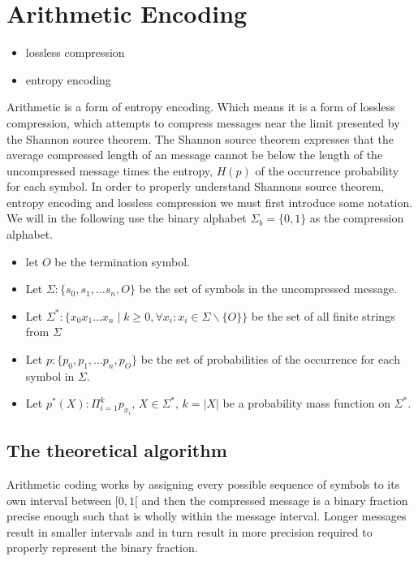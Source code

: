 \chapter{Arithmetic Encoding}
\begin{itemize}
    \item lossless compression
    \item entropy encoding
\end{itemize}

Arithmetic is a form of entropy encoding. Which means it is a form of lossless compression, which attempts to compress messages near the limit presented by the Shannon source theorem. The Shannon source theorem expresses that the average compressed length of an message cannot be below the length of the uncompressed message times the entropy, $H(p)$ of the occurrence probability for each symbol. In order to properly understand Shannons source theorem, entropy encoding and lossless compression we must first introduce some notation. We will in the following use the binary alphabet $\Sigma_b = \{0,1\}$ as the compression alphabet.\\

\begin{itemize}
    \item let $O$ be the termination symbol.
    \item Let $\Sigma : \{s_0,s_1, \dots s_n,O\}$ be the set of symbols in the uncompressed message. 
    \item Let $\Sigma^* : \{x_0x_1 \dots x_n \mid  k\geq0   ,\forall x_i : x_i \in \Sigma \backslash \{O\} \}$ be the set of all finite strings from $\Sigma$
    \item Let $p : \{p_0,p_1, \dots p_n,p_O\}$ be the set of probabilities of the occurrence for each symbol in $\Sigma$.
    \item Let $p^*(X) : \Pi_{i=1}^k p_{x_i},\, X \in \Sigma^*,\, k = |X|$ be a probability mass function on $\Sigma^*$.
\end{itemize}




\section{The theoretical algorithm}

Arithmetic coding works by assigning every possible sequence of symbols to its own interval between $[0,1[$ and then the compressed message is a binary fraction precise enough such that is wholly within the message interval. Longer messages result in smaller intervals and in turn result in more precision required to properly represent the binary fraction.

